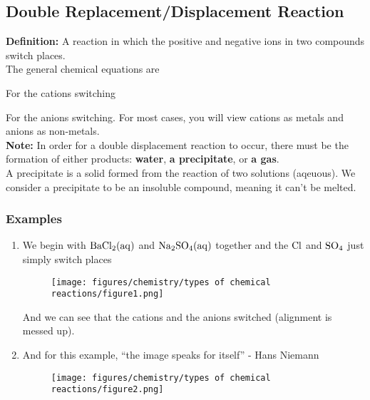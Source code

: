 \documentclass[12pt]{report}
\begin{document}
\subsection{Double Replacement/Displacement Reaction}
\textbf{Definition:} A reaction in which the positive and negative ions in two compounds switch places.\\

The general chemical equations are 
\begin{center}
\end{center}
For the cations switching
\begin{center}
\end{center}
For the anions switching. For most cases, you will view cations as metals and anions as non-metals.\\ 

\textbf{Note:} In order for a double displacement reaction to occur, there must be the formation of either products: \textbf{water}, \textbf{a precipitate}, or \textbf{a gas}.\\

A precipitate is a solid formed from the reaction of two solutions (aqeuous). We consider a precipitate to be an insoluble compound, meaning it can't be melted.

\subsubsection{Examples}
\begin{enumerate}
\setlength\itemsep{0.5em}
    \item{We begin with $ \ce{BaCl2(aq)}$ and $ \ce{Na2SO4(aq)}$ together and the $ \ce{Cl}$ and $ \ce{SO4}$ just simply switch places
            \begin{figure}[htb!]
            \centering
                \texttt{[image: figures/chemistry/types of chemical reactions/figure1.png]}
            \end{figure}
       }

    And we can see that the cations and the anions switched (alignment is messed up). 
    \item{And for this example, ``the image speaks for itself'' - Hans Niemann
            \begin{figure}[htb!]
            \centering
                \texttt{[image: figures/chemistry/types of chemical reactions/figure2.png]}
            \end{figure}
        }
    
\end{enumerate}
\end{document}
